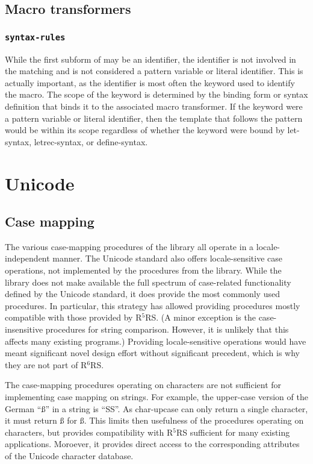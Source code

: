 \documentclass[twoside,twocolumn]{algol60}
\newcommand{\rn}[1]{R$^{#1}$RS}
\begin{document}
\section{Macro transformers}

\subsection{{\tt syntax-rules}}

While the first subform of  may be an identifier, the
identifier is not involved in the matching and is not considered a
pattern variable or literal identifier.  This is actually important,
as the identifier is most often the keyword used to identify the
macro.  The scope of the keyword is determined by the binding form or
syntax definition that binds it to the associated macro transformer.
If the keyword were a pattern variable or literal identifier, then the
template that follows the pattern would be within its scope regardless
of whether the keyword were bound by {\cf let-syntax}, {\cf
  letrec-syntax}, or {\cf define-syntax}.


\chapter{Unicode}

\section{Case mapping}

The various case-mapping procedures of the 
library all operate in a locale-independent manner.  The Unicode
standard also offers locale-sensitive case operations, not implemented
by the procedures from the  library.  While the
library does not make available the full spectrum of case-related
functionality defined by the Unicode standard, it does provide the
most commonly used procedures.  In particular, this strategy has
allowed providing procedures mostly compatible with those provided by
\rn{5}.  (A minor exception is the case-insensitive procedures for
string comparison.  However, it is unlikely that this affects many
existing programs.)  Providing locale-sensitive operations would have
meant significant novel design effort without significant precedent,
which is why they are not part of \rn{6}.

The case-mapping procedures operating on characters are not sufficient
for implementing case mapping on strings.  For example, the upper-case
version of the German ``\ss{}'' in a string is ``SS''.  As {\cf
  char-upcase} can only return a single character, it must return
\ss{} for \ss.  This limits then usefulness of the procedures
operating on characters, but provides compatibility with \rn{5}
sufficient for many existing applications.  Moroever, it provides
direct access to the corresponding attributes of the Unicode character
database.
\end{document}
